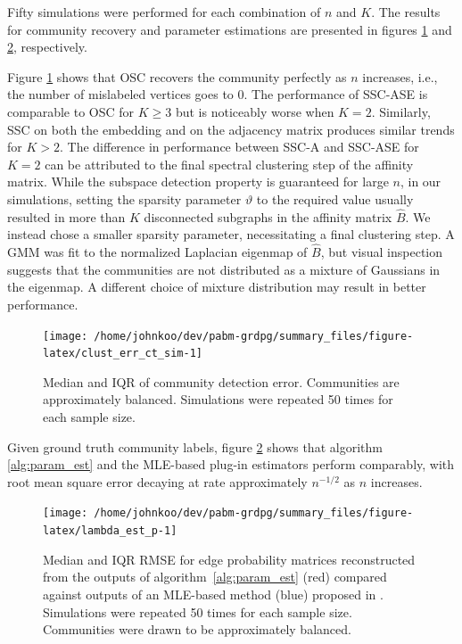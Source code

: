 \documentclass[
  12pt,
]{article}
\theoremstyle{definition}
\theoremstyle{definition}
\theoremstyle{definition}
\theoremstyle{definition}
\theoremstyle{remark}
\begin{document}
Fifty simulations were performed for each combination of \(n\) and \(K\).
The results for community recovery and parameter estimations are presented in figures \ref{fig:clust_err_ct_sim} and \ref{fig:p_block_est}, respectively.

Figure \ref{fig:clust_err_ct_sim} shows that OSC recovers the community
perfectly as \(n\) increases, i.e., the number of mislabeled vertices
goes to \(0\).
The performance of SSC-ASE is comparable to OSC for \(K \geq 3\) but is noticeably worse when \(K = 2\).
Similarly, SSC on both the embedding and on the adjacency matrix produces similar trends for \(K > 2\).
The difference in performance between SSC-A and SSC-ASE for \(K = 2\) can be attributed to the final spectral clustering step of the affinity matrix. While the subspace detection property is guaranteed for large \(n\), in our simulations, setting the
sparsity parameter \(\vartheta\) to the required value usually resulted
in more than \(K\) disconnected subgraphs in the affinity matrix
\(\hat{B}\).
We instead chose a smaller sparsity parameter,
necessitating a final clustering step.
A GMM was fit to the normalized Laplacian eigenmap of \(\hat{B}\),
but visual inspection suggests that the communities are not
distributed as a mixture of Gaussians in the eigenmap.
A different choice of mixture distribution may result in better performance.

\begin{figure}[tp]
{\centering \texttt{[image: /home/johnkoo/dev/pabm-grdpg/summary\_files/figure-latex/clust\_err\_ct\_sim-1]}
}
\caption{Median and IQR of community detection error. Communities are approximately balanced. Simulations were repeated 50 times for each sample size.}
\label{fig:clust_err_ct_sim}
\end{figure}

Given ground truth community labels, figure \ref{fig:p_block_est} shows
that algorithm \ref{alg:param_est} and the MLE-based
plug-in estimators perform comparably, with root mean square
error decaying at rate approximately \(n^{-1/2}\) as \(n\) increases.

\begin{figure}[tp]
{\centering \texttt{[image: /home/johnkoo/dev/pabm-grdpg/summary\_files/figure-latex/lambda\_est\_p-1]}}
\caption{Median and IQR RMSE for edge probability matrices
reconstructed from the outputs of algorithm~\ref{alg:param_est}
(red) compared against outputs of an MLE-based method (blue) proposed in \citet{307cbeb9b1be48299388437423d94bf1}.
Simulations were repeated 50 times for each sample size. Communities were drawn to be approximately balanced.}
\label{fig:p_block_est}
\end{figure}
\end{document}

